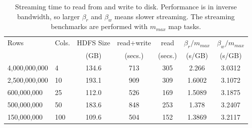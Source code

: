 \documentclass[10pt, conference, compsocconf]{IEEEtran}
\begin{document}
\begin{table*}[tbp]
\vspace{-\baselineskip}
\centering
\caption{Streaming time to read from and write to disk.  Performance is in inverse bandwidth, so larger $\beta_r$ and $\beta_w$ means slower streaming.  The streaming benchmarks are performed with $m_{max}$ map tasks.}
\begin{tabular}{l l c @{\qquad\qquad} c c @{\qquad\qquad} c c}
\toprule
Rows & Cols. & HDFS Size & read+write & read & $\beta_r/m_{max}$ & $\beta_w/m_{max}$ \\
           &            &    (GB)         &     (secs.)     & (secs.) & (s/GB)    & (s/GB) \\
\midrule
4,000,000,000 & 4     & 134.6 & 713 & 305 & 2.266 & 3.0312 \\
2,500,000,000 & 10   & 193.1 & 909 & 309 & 1.6002 & 3.1072 \\
600,000,000    & 25   & 112.0 & 526 & 169 & 1.5089 & 3.1875 \\
500,000,000    & 50   & 183.6 & 848 & 253 & 1.378 & 3.2407 \\
150,000,000    & 100 & 109.6 & 504 & 152 & 1.3869 & 3.2117 \\
\bottomrule
\end{tabular}
\label{tab:streaming}
\end{table*}
\end{document}
